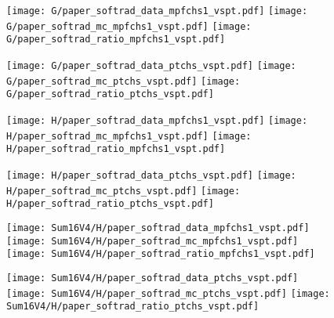 \documentclass[landscape,10pt]{beamer} %
\begin{document}
\newpage

\begin{figure}[p]
\centering
  \texttt{[image: G/paper\_softrad\_data\_mpfchs1\_vspt.pdf]}
  \texttt{[image: G/paper\_softrad\_mc\_mpfchs1\_vspt.pdf]}
  \texttt{[image: G/paper\_softrad\_ratio\_mpfchs1\_vspt.pdf]}
\end{figure}

\begin{figure}[p]
\centering
  \texttt{[image: G/paper\_softrad\_data\_ptchs\_vspt.pdf]}
  \texttt{[image: G/paper\_softrad\_mc\_ptchs\_vspt.pdf]}
  \texttt{[image: G/paper\_softrad\_ratio\_ptchs\_vspt.pdf]}
\end{figure}

\newpage

\begin{figure}[p]
\centering
  \texttt{[image: H/paper\_softrad\_data\_mpfchs1\_vspt.pdf]}
  \texttt{[image: H/paper\_softrad\_mc\_mpfchs1\_vspt.pdf]}
  \texttt{[image: H/paper\_softrad\_ratio\_mpfchs1\_vspt.pdf]}
\end{figure}

\begin{figure}[p]
\centering
  \texttt{[image: H/paper\_softrad\_data\_ptchs\_vspt.pdf]}
  \texttt{[image: H/paper\_softrad\_mc\_ptchs\_vspt.pdf]}
  \texttt{[image: H/paper\_softrad\_ratio\_ptchs\_vspt.pdf]}
\end{figure}

\newpage

\begin{figure}[p]
\centering
  \texttt{[image: Sum16V4/H/paper\_softrad\_data\_mpfchs1\_vspt.pdf]}
  \texttt{[image: Sum16V4/H/paper\_softrad\_mc\_mpfchs1\_vspt.pdf]}
  \texttt{[image: Sum16V4/H/paper\_softrad\_ratio\_mpfchs1\_vspt.pdf]}
\end{figure}

\begin{figure}[p]
\centering
  \texttt{[image: Sum16V4/H/paper\_softrad\_data\_ptchs\_vspt.pdf]}
  \texttt{[image: Sum16V4/H/paper\_softrad\_mc\_ptchs\_vspt.pdf]}
  \texttt{[image: Sum16V4/H/paper\_softrad\_ratio\_ptchs\_vspt.pdf]}
\end{figure}

\newpage
\end{document}
